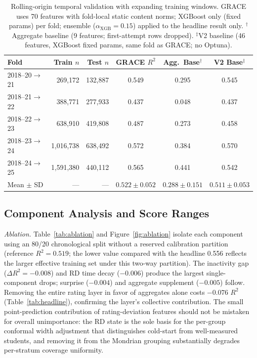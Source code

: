 \documentclass[11pt]{article}
\begin{document}
\begin{table}[ht]
\centering
\caption{Rolling-origin temporal validation with expanding training windows.
GRACE uses 70 features with fold-local static content norms; XGBoost only (fixed params)
per fold; ensemble ($\alpha_{\text{XGB}}=0.15$) applied to the headline result only.
$^\dagger$Aggregate baseline (9 features; first-attempt rows dropped).
$^\ddagger$V2 baseline (46 features, XGBoost fixed params, same fold as GRACE; no Optuna).}
\label{tab:rolling}
\small
\begin{tabular}{@{}lrrccc@{}}
\toprule
\textbf{Fold} & \textbf{Train} $n$ & \textbf{Test} $n$ &
\textbf{GRACE} $R^{2}$ &
\textbf{Agg.\ Base}$^\dagger$ & \textbf{V2 Base}$^\ddagger$ \\
\midrule
2018--20$\to$21 & 269,172   & 132,887 & 0.549 & 0.295 & 0.545 \\
2018--21$\to$22 & 388,771   & 277,933 & 0.437 & 0.048 & 0.437 \\
2018--22$\to$23 & 638,910   & 419,808 & 0.487 & 0.273 & 0.458 \\
2018--23$\to$24 & 1,016,738 & 638,492 & 0.572 & 0.384 & 0.570 \\
2018--24$\to$25 & 1,591,380 & 440,112 & 0.565 & 0.441 & 0.542 \\
\midrule
Mean $\pm$ SD & --- & --- &
$\bm{0.522 \pm 0.052}$ &
$0.288 \pm 0.151$ & $0.511 \pm 0.053$ \\
\bottomrule
\end{tabular}
\end{table}

\subsection{Component Analysis and Score Ranges}

\textit{Ablation.}\quad
Table~\ref{tab:ablation} and Figure~\ref{fig:ablation} isolate each component using
an 80/20 chronological split without a reserved calibration partition
(reference $R^{2} = 0.519$; the lower value compared with the headline 0.556 reflects
the larger effective training set under this two-way partition).
The inactivity gap ($\Delta R^{2} = -0.008$) and RD time decay ($-0.006$) produce the
largest single-component drops; surprise ($-0.004$) and aggregate supplement ($-0.005$)
follow.
Removing the entire rating layer in favor of aggregates alone costs $-0.076$ $R^{2}$
(Table~\ref{tab:headline}), confirming the layer's collective contribution.
The small point-prediction contribution of rating-deviation features should not be
mistaken for overall unimportance: the RD state is the sole basis for the per-group
conformal width adjustment that distinguishes cold-start from well-measured students,
and removing it from the Mondrian grouping substantially degrades per-stratum coverage uniformity.
\end{document}
